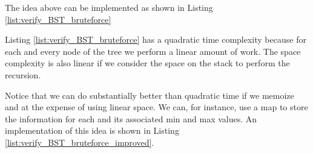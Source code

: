 The idea above can be implemented as shown in Listing \ref{list:verify_BST_bruteforce}



Listing \ref{list:verify_BST_bruteforce} has a quadratic time complexity because for each and every node of the tree we perform a linear amount of work. The space complexity is also linear if we consider the space on the stack to perform the recursion.


Notice that we can do substantially better than quadratic time if we memoize  and  at the expense of using linear space. We can, for instance, use a map to store the information for each  and its associated min and max values. An implementation of this idea is shown in Listing \ref{list:verify_BST_bruteforce_improved}.


